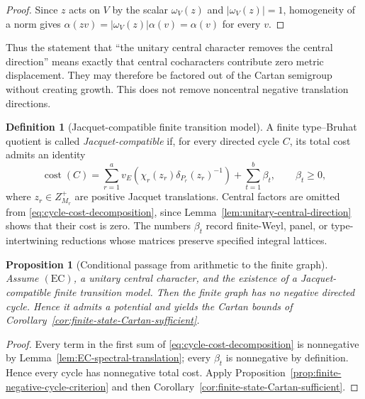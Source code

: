 \documentclass[12pt]{article}
\newtheorem{proposition}[theorem]{Proposition}
\theoremstyle{definition}
\newtheorem{definition}[theorem]{Definition}
\theoremstyle{remark}
\begin{document}
\begin{proof}
Since $z$ acts on $V$ by the scalar $\omega_V(z)$ and
$|\omega_V(z)|=1$, homogeneity of a norm gives
$\alpha(zv)=|\omega_V(z)|\alpha(v)=\alpha(v)$ for every $v$.
\end{proof}

Thus the statement that ``the unitary central character removes the central
direction'' means exactly that central cocharacters contribute zero metric
displacement.  They may therefore be factored out of the Cartan semigroup
without creating growth.  This does not remove noncentral negative
translation directions.

\begin{definition}[Jacquet-compatible finite transition model]
\label{def:Jacquet-compatible-transition-model}
A finite type--Bruhat quotient is called \emph{Jacquet-compatible} if, for
every directed cycle $C$, its total cost admits an identity
\begin{equation}\label{eq:cycle-cost-decomposition}
 \operatorname{cost}(C)
 =\sum_{r=1}^a
   v_E\!\left(\chi_r(z_r)\delta_{P_r}(z_r)^{-1}\right)
  +\sum_{t=1}^b \beta_t,
 \qquad \beta_t\geq0,
\end{equation}
where $z_r\in Z_{M_r}^+$ are positive Jacquet translations.  Central
factors are omitted from \eqref{eq:cycle-cost-decomposition}, since
Lemma~\ref{lem:unitary-central-direction} shows that their cost is zero.
The numbers $\beta_t$ record finite-Weyl, panel, or type-intertwining
reductions whose matrices preserve specified integral lattices.
\end{definition}

\begin{proposition}[Conditional passage from arithmetic to the finite graph]
\label{prop:Jacquet-compatible-no-negative-cycle}
Assume $(\mathrm{EC})$, a unitary central character, and the existence of a
Jacquet-compatible finite transition model.  Then the finite graph has no
negative directed cycle.  Hence it admits a potential and yields the Cartan
bounds of Corollary~\ref{cor:finite-state-Cartan-sufficient}.
\end{proposition}

\begin{proof}
Every term in the first sum of
\eqref{eq:cycle-cost-decomposition} is nonnegative by
Lemma~\ref{lem:EC-spectral-translation}; every $\beta_t$ is nonnegative by
definition.  Hence every cycle has nonnegative total cost.  Apply
Proposition~\ref{prop:finite-negative-cycle-criterion} and then
Corollary~\ref{cor:finite-state-Cartan-sufficient}.
\end{proof}
\end{document}
